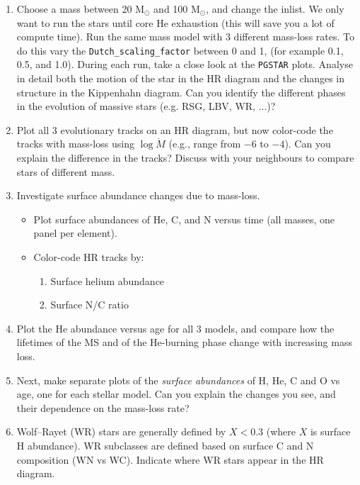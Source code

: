\documentclass[11pt,a4paper]{article}
\begin{document}
\begin{enumerate}[label=(\alph*)]
\item Choose a mass between 20 M$_\odot$ and 100 M$_\odot$, and change the inlist. 
We only want to run the stars until core He exhaustion (this will save you a lot of compute time).
Run the same mass model with 3 different mass-loss rates. To do this vary the \verb|Dutch_scaling_factor| between 0 and 1, (for example 0.1, 0.5, and 1.0). 
During each run, take a close look at the \texttt{PGSTAR} plots. Analyse in detail both the motion of the star in the HR diagram and the changes in structure in the Kippenhahn diagram. Can you identify the different phases in the evolution of massive stars (e.g. RSG, LBV, WR, ...)? 

\item Plot all 3 evolutionary tracks on an HR diagram, but now color-code the tracks with mass-loss using $\log \dot{M}$ (e.g., range from $-6$ to $-4$).
Can you explain the difference in the tracks? 
Discuss with your neighbours to compare stars of different mass.

\item Investigate surface abundance changes due to mass-loss. 
\begin{itemize}
    \item Plot surface abundances of He, C, and N versus time (all masses, one panel per element).
    \item Color-code HR tracks by:
    \begin{enumerate}
        \item Surface helium abundance
        \item Surface N/C ratio
    \end{enumerate}

\end{itemize}

\item Plot the He abundance versus age for all 3 models, and compare how the lifetimes of the MS and of the He-burning phase change with increasing mass loss.

\item Next, make separate plots of the \emph{surface abundances} of H, He, C and O vs age, one for each stellar model. Can you explain the changes you see, and their dependence on the mass-loss rate?


\item Wolf–Rayet (WR) stars are generally defined by $X < 0.3$ (where $X$ is surface H abundance). WR subclasses are defined based on surface C and N composition (WN vs WC). Indicate where WR stars appear in the HR diagram.


\end{enumerate}
\end{document}
